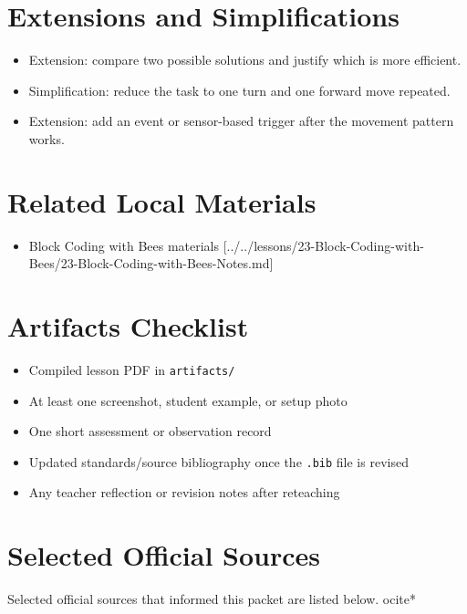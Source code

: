 \documentclass[11pt]{article}
\begin{document}
\section*{Extensions and Simplifications}
\begin{itemize}[leftmargin=*]
\item Extension: compare two possible solutions and justify which is more efficient.
\item Simplification: reduce the task to one turn and one forward move repeated.
\item Extension: add an event or sensor-based trigger after the movement pattern works.
\end{itemize}

\section*{Related Local Materials}
\begin{itemize}[leftmargin=*]
\item Block Coding with Bees materials [../../lessons/23-Block-Coding-with-Bees/23-Block-Coding-with-Bees-Notes.md]
\end{itemize}

\section*{Artifacts Checklist}
\begin{itemize}[leftmargin=*]
\item Compiled lesson PDF in \texttt{artifacts/}
\item At least one screenshot, student example, or setup photo
\item One short assessment or observation record
\item Updated standards/source bibliography once the \texttt{.bib} file is revised
\item Any teacher reflection or revision notes after reteaching
\end{itemize}

\section*{Selected Official Sources}
Selected official sources that informed this packet are listed below.
ocite{*}



\end{document}
